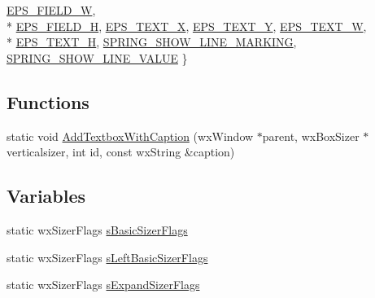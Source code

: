 \begin{DoxyCompactItemize}
\hyperlink{a00187_a99fb83031ce9923c84392b4e92f956b5a2d65c5b7dfbac1efc6c9dc3fee56357c}{E\-P\-S\-\_\-\-F\-I\-E\-L\-D\-\_\-\-W}, 
\\*
\hyperlink{a00187_a99fb83031ce9923c84392b4e92f956b5a806841c228ee14b8b3c74f6f0640b5a0}{E\-P\-S\-\_\-\-F\-I\-E\-L\-D\-\_\-\-H}, 
\hyperlink{a00187_a99fb83031ce9923c84392b4e92f956b5a3b67c6f99083ab8237233ee450c03bf7}{E\-P\-S\-\_\-\-T\-E\-X\-T\-\_\-\-X}, 
\hyperlink{a00187_a99fb83031ce9923c84392b4e92f956b5abcb7c74d763232af2c0cf2d8d44d8b5b}{E\-P\-S\-\_\-\-T\-E\-X\-T\-\_\-\-Y}, 
\hyperlink{a00187_a99fb83031ce9923c84392b4e92f956b5a73458dd3afc95e8714ccb70b77154441}{E\-P\-S\-\_\-\-T\-E\-X\-T\-\_\-\-W}, 
\\*
\hyperlink{a00187_a99fb83031ce9923c84392b4e92f956b5a7bd804e3b36f9b1da0b3b984d3a119a4}{E\-P\-S\-\_\-\-T\-E\-X\-T\-\_\-\-H}, 
\hyperlink{a00187_a99fb83031ce9923c84392b4e92f956b5a3ab97fb1be8d8fceb9576660c48cd191}{S\-P\-R\-I\-N\-G\-\_\-\-S\-H\-O\-W\-\_\-\-L\-I\-N\-E\-\_\-\-M\-A\-R\-K\-I\-N\-G}, 
\hyperlink{a00187_a99fb83031ce9923c84392b4e92f956b5aeaf97ec1ac4273649249cdaab2f8a27f}{S\-P\-R\-I\-N\-G\-\_\-\-S\-H\-O\-W\-\_\-\-L\-I\-N\-E\-\_\-\-V\-A\-L\-U\-E}
 \}
\end{DoxyCompactItemize}
\subsection*{Functions}
\begin{DoxyCompactItemize}
\item 
static void \hyperlink{a00187_a5cb8f608a46a558d73da91a66ed2e975}{Add\-Textbox\-With\-Caption} (wx\-Window $\ast$parent, wx\-Box\-Sizer $\ast$verticalsizer, int id, const wx\-String \&caption)
\end{DoxyCompactItemize}
\subsection*{Variables}
\begin{DoxyCompactItemize}
\item 
static wx\-Sizer\-Flags \hyperlink{a00187_a3cc8021155ab50052e937d9b0d9f85ac}{s\-Basic\-Sizer\-Flags}
\item 
static wx\-Sizer\-Flags \hyperlink{a00187_af1a7469b4d785cae77750cdfd0ec3120}{s\-Left\-Basic\-Sizer\-Flags}
\item 
static wx\-Sizer\-Flags \hyperlink{a00187_af2842eda21393457c5416266a7bdcd47}{s\-Expand\-Sizer\-Flags}
\end{DoxyCompactItemize}


